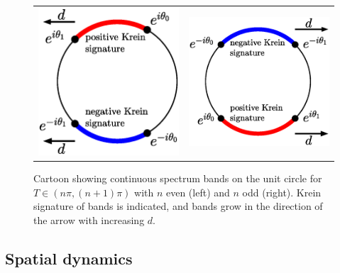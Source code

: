 \documentclass[12pt,reqno]{amsart}
\begin{document}
\begin{figure}
	\begin{center}
	\begin{tabular}{cc}
	\includegraphics[width=7.5cm]{contspeccartoon1.eps} &
	\includegraphics[width=7.5cm]{contspeccartoon2.eps}
	\end{tabular}
	\end{center}
	\caption{Cartoon showing continuous spectrum bands on the unit circle for $T \in (n \pi, (n+1)\pi)$ with $n$ even (left) and $n$ odd (right). Krein signature of bands is indicated, and bands grow in the direction of the arrow with increasing $d$.}
	\label{fig:bands}
\end{figure}

\subsection{Spatial dynamics}
\end{document}
